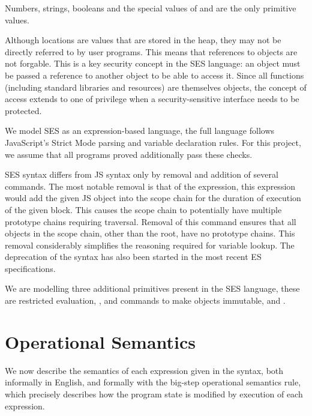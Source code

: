 \documentclass[a4paper,notitlepage]{report}
\begin{document}
  Numbers, strings, booleans and the special values of \und and \nil are the
  only primitive values.

  Although locations are values that are stored in the heap, they
  may not be directly referred to by user programs. This means that
  references to objects are not forgable. This is a key security concept in the
  SES language: an object must be passed a reference to another object to be
  able to access it.
  Since all functions (including standard libraries and resources) are
  themselves objects, the concept of access extends to one of privilege when a
  security-sensitive interface needs to be protected.

  We model SES as an expression-based language, the full language follows
  JavaScript's Strict Mode parsing and variable declaration rules. For this
  project, we assume that all programs proved additionally pass these checks.

  SES syntax differs from JS syntax only by removal and addition of several
  commands. The most notable removal is that of the  expression, this
  expression would add the given JS object into the scope chain for the duration
  of execution of the given block. This causes the scope chain to potentially
  have multiple prototype chains requiring traversal. Removal of this command
  ensures that all objects in the scope chain, other than the root, have no
  prototype chains. This removal considerably simplifies the reasoning required
  for variable lookup. The deprecation of the  syntax has also been
  started in the most recent ES specifications.

  We are modelling three additional primitives present in the SES language,
  these are restricted evaluation, , and commands to make objects
  immutable,  and .


  \section{Operational Semantics}
  \label{sec:opsems}


  We now describe the semantics of each expression given in the syntax, both
  informally in English, and formally with the big-step operational semantics
  rule, which precisely describes how the program state is modified by execution
  of each expression.
\end{document}
